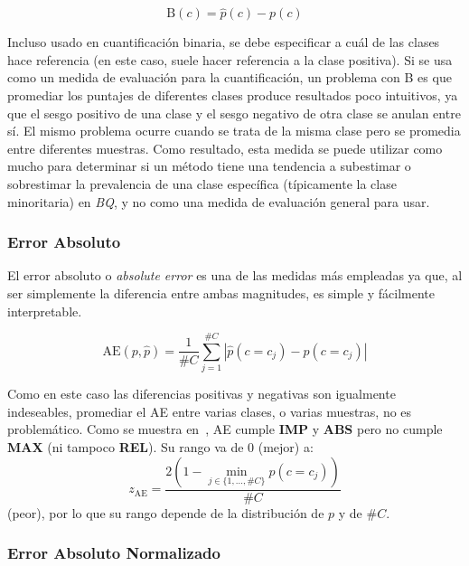 \begin{equation}
    {\text{B}(c)} = \hat p(c) - p(c)
\end{equation}

Incluso usado en cuantificación binaria, se debe especificar a cuál de las
clases hace referencia (en este caso, suele hacer referencia a la clase
positiva). Si se usa como un medida de evaluación para la cuantificación, un
problema con B es que promediar los puntajes de diferentes clases produce
resultados poco intuitivos, ya que el sesgo positivo de una clase y el sesgo
negativo de otra clase se anulan entre sí. El mismo problema ocurre cuando se
trata de la misma clase pero se promedia entre diferentes muestras. Como
resultado, esta medida se puede utilizar como mucho para determinar si un método
tiene una tendencia a subestimar o sobrestimar la prevalencia de una clase
específica (típicamente la clase minoritaria) en {\it BQ}, y no como una medida
de evaluación general para usar.

\subsubsection{Error Absoluto}\label{evaluacion:ae}

El error absoluto o {\it absolute error\/} es una de las medidas más empleadas
ya que, al ser simplemente la diferencia entre ambas magnitudes, es simple y
fácilmente interpretable.

\begin{equation}
    {\text{AE}(p, \hat p)} = \frac{1}{\#C}\sum \limits_{j=1}^{\#C}{|\hat p(c=c_j) - p(c=c_j)|}
\end{equation}

Como en este caso las diferencias positivas y negativas son igualmente
indeseables, promediar el AE entre varias clases, o varias muestras, no es
problemático. Como se muestra en~\cite{sebastiani2020evaluation}, AE cumple {\bf
IMP} y {\bf ABS} pero no cumple {\bf MAX} (ni tampoco {\bf REL}). Su rango va de
0 (mejor) a:
\begin{equation}
    z_{\text{AE}} = \frac{2(1-\displaystyle \min_{j\in\{1,\dots,\#C\}}p(c=c_j))}{\#C}
\end{equation}
(peor), por lo que su rango depende de la distribución de $p$ y de $\#C$.

\subsubsection{Error Absoluto Normalizado}\label{evaluacion:nae}

